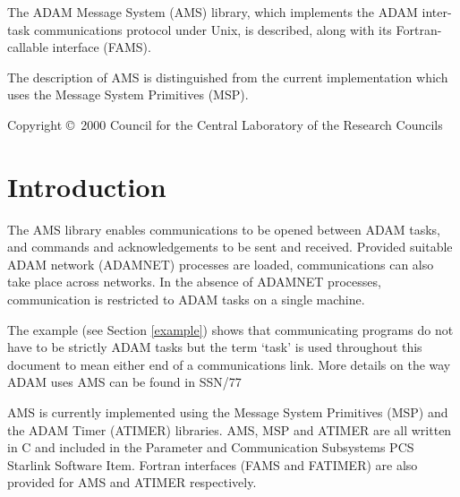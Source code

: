 \documentclass[twoside,11pt]{article}
\newcommand{\stardocinitials}  {SUN}
\newcommand{\stardoccopyright} 
{Copyright 
\copyright\ 2000 Council for the Central Laboratory of the Research Councils}
\newcommand{\stardocnumber}    {241.0}
\newcommand{\stardocabstract}  {The ADAM Message System (AMS) library, which
implements the ADAM inter-task communications protocol under Unix, is
described, along with its Fortran-callable interface (FAMS).

The description of AMS is distinguished from the current implementation which
uses the Message System Primitives (MSP).}
\newcommand{\stardocname}{\stardocinitials /\stardocnumber}
\newcommand{\htmlref}[2]{#1}
\newenvironment{latexonly}{}{}
\newcommand{\latex}[1]{#1}
\newcommand{\xref}[3]{#1}
\renewcommand{\_}{\texttt{\symbol{95}}}
\renewcommand{\thepage}{\roman{page}}
\begin{document}
\stardocabstract

\begin{latexonly}
\newpage
\vspace*{\fill}
\stardoccopyright
\end{latexonly}

  \newpage
  \begin{latexonly}
    \setlength{\parskip}{0mm}
    \tableofcontents
    \setlength{\parskip}{\medskipamount}
    \markboth{\stardocname}{\stardocname}
  \end{latexonly}

\cleardoublepage
\renewcommand{\thepage}{\arabic{page}}
\setcounter{page}{1}

\section{Introduction}
The AMS library enables communications to be opened between ADAM tasks, and
commands and acknowledgements to be sent and received. Provided suitable ADAM
network (ADAMNET) processes are loaded, communications can also take place
across networks.
In the absence of ADAMNET processes, communication is restricted to ADAM
tasks on a single machine.

The
\htmlref{example}{example} \latex{ (see Section \ref{example})}
shows that communicating programs do not have to be strictly ADAM tasks but 
the term `task' is used throughout this document to mean either end of a
communications link.
More details on the way ADAM uses AMS can be found in
\xref{SSN/77}{ssn77}{}

AMS is currently implemented using the Message System Primitives (MSP) and the
ADAM Timer (ATIMER) libraries.
AMS, MSP and ATIMER are all written in C and included in the Parameter and
Communication Subsystems
\xref{PCS}{ssn29}{}
Starlink Software Item. Fortran interfaces (FAMS and FATIMER) are also provided
for AMS and ATIMER respectively.
\end{document}
